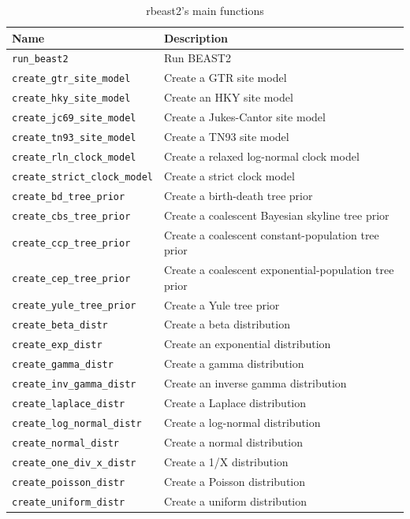 \documentclass{article}
\begin{document}
\begin{table}[]
\centering
\begin{tabular}{ | l | l | }
\hline
\textbf{Name} & \textbf{Description} \\
\hline
\verb;run_beast2; & Run BEAST2 \\
\hline
\verb;create_gtr_site_model; & Create a GTR site model \\
\verb;create_hky_site_model; & Create an HKY site model \\
\verb;create_jc69_site_model; & Create a Jukes-Cantor site model \\
\verb;create_tn93_site_model; & Create a TN93 site model \\
\hline
\verb;create_rln_clock_model; & Create a relaxed log-normal clock model \\
\verb;create_strict_clock_model; & Create a strict clock model \\
\hline
\verb;create_bd_tree_prior; & Create a birth-death tree prior \\
\verb;create_cbs_tree_prior; & Create a coalescent Bayesian skyline tree prior \\
\verb;create_ccp_tree_prior; & Create a coalescent constant-population tree prior \\
\verb;create_cep_tree_prior; & Create a coalescent exponential-population tree prior \\
\verb;create_yule_tree_prior; & Create a Yule tree prior \\
\hline
\verb;create_beta_distr; & Create a beta distribution \\
\verb;create_exp_distr; & Create an exponential distribution \\
\verb;create_gamma_distr; & Create a gamma distribution \\
\verb;create_inv_gamma_distr; & Create an inverse gamma distribution \\
\verb;create_laplace_distr; & Create a Laplace distribution \\
\verb;create_log_normal_distr; & Create a log-normal distribution \\
\verb;create_normal_distr; & Create a normal distribution \\
\verb;create_one_div_x_distr; & Create a 1/X distribution \\
\verb;create_poisson_distr; & Create a Poisson distribution \\
\verb;create_uniform_distr; & Create a uniform distribution \\
\hline
\end{tabular}
\caption{rbeast2's main functions}
\label{tab:functions}
\end{table}
\end{document}
